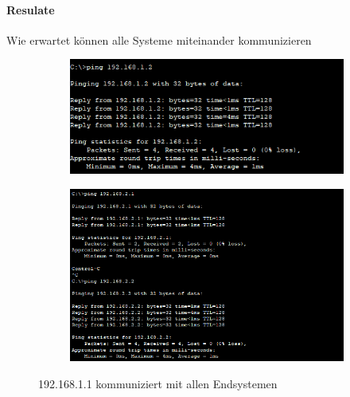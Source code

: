 \paragraph{Resulate}
Wie erwartet können alle Systeme miteinander kommunizieren
\begin{figure}[!htb]
    \centering
    \begin{subfigure}{.8\textwidth}
        \includegraphics[width=\textwidth,height=\textwidth,keepaspectratio]{./img/test2/User1.png}
    \end{subfigure}
    \begin{subfigure}{.8\textwidth}
        \includegraphics[width=\textwidth,height=\textwidth,keepaspectratio]{./img/test2/user1_t2.png}
    \end{subfigure}
    \caption{192.168.1.1 kommuniziert mit allen Endsystemen}
\end{figure}
\FloatBarrier